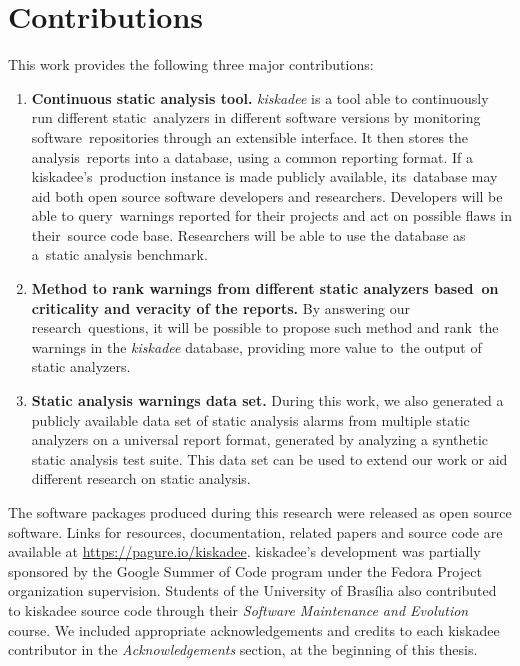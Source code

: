 \section{Contributions}
\label{sec:contributions}

This work provides the following three major contributions:

\begin{enumerate}[label=C\arabic*]
  \item \textbf{Continuous static analysis tool.}
    \textit{kiskadee} is a tool able to continuously run different static\
    analyzers in different software versions by monitoring software\
    repositories through an extensible interface. It then stores the analysis\
    reports into a database, using a common reporting format. If a kiskadee's\
    production instance is made publicly available, its\ database may aid both
    open source software developers and researchers. Developers will be able to
    query\ warnings reported for their projects and act on possible flaws in
    their\ source code base. Researchers will be able to use the database as a\
    static analysis benchmark.

  \item \textbf{Method to rank warnings from different static analyzers based\
    on criticality and veracity of the reports.} By answering our research\
    questions, it will be possible to propose such method and rank\
    the warnings in the \textit{kiskadee} database, providing more value to\
    the output of static analyzers.

  \item \textbf{Static analysis warnings data set.} During this work, we also
    generated a publicly available data set of static analysis alarms from
    multiple static analyzers on a universal report format, generated by
    analyzing a synthetic static analysis test suite. This data set can be used
    to extend our work or aid different research on static analysis.

\end{enumerate}

The software packages produced during this research were released as open
source software. Links for resources, documentation, related papers and source
code are available at \url{https://pagure.io/kiskadee}. kiskadee's development
was partially sponsored by the Google Summer of Code program under the Fedora
Project organization supervision. Students of the University of Brasília also
contributed to kiskadee source code through their \textit{Software Maintenance
and Evolution} course. We included appropriate acknowledgements and credits to each
kiskadee contributor in the \emph{Acknowledgements} section, at the beginning of
this thesis.

